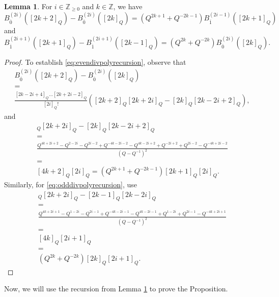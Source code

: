 \documentclass[10pt]{amsart}
\numberwithin{equation}{section}
\theoremstyle{definition}
\newtheorem{lemma}[theorem]{Lemma}
\begin{document}
\begin{lemma}\label{lem:divpowerpolyrecursion}
For $i\in \mathbb{Z}_{\ge 0}$ and $k\in \mathbb{Z}$, we have
    \begin{equation}\label{eq:evendivpolyrecursion}
    B_{\overline{0}}^{(2i)}([2k+2]_Q)-B_{\overline{0}}^{(2i)}([2k]_Q)=(Q^{2k+1}+Q^{-2k-1})B_{\overline{1}}^{(2i-1)}([2k+1]_Q)
\end{equation}
and
\begin{equation}\label{eq:odddivpolyrecursion}
    B_{\overline{1}}^{(2i+1)}([2k+1]_Q)-B_{\overline{1}}^{(2i+1)}([2k-1]_Q)=(Q^{2k}+Q^{-2k})B_{\overline{0}}^{(2i)}([2k]_Q).
\end{equation}
\end{lemma}
\begin{proof}
To establish \eqref{eq:evendivpolyrecursion}, observe that
\begin{gather*}
    B_{\overline{0}}^{(2i)}([2k+2]_Q)-B_{\overline{0}}^{(2i)}([2k]_Q)\\
    =\\
    \frac{[2k-2i+4]_Q\dots [2k+2i-2]_Q}{[2i]_Q!}([2k+2]_Q[2k+2i]_Q-[2k]_Q[2k-2i+2]_Q),
\end{gather*}
and 
\begin{gather*}
    [2k+2]_Q[2k+2i]_Q-[2k]_Q[2k-2i+2]_Q\\
    =
    \\
    \frac{Q^{4k+2i+2}-Q^{2-2i}-Q^{2i-2}+Q^{-4k-2i-2}-Q^{4k-2i+2}+Q^{-2i+2}+Q^{2i-2}-Q^{-4k+2i-2}}{(Q-Q^{-1})^2}\\
    =\\
    [4k+2]_Q[2i]_Q=(Q^{2k+1}+Q^{-2k-1})[2k+1]_Q[2i]_Q.
\end{gather*}
Similarly, for \eqref{eq:odddivpolyrecursion}, use
\begin{gather*}
    [2k+1]_Q[2k+2i]_Q-[2k-1]_Q[2k-2i]_Q\\
    =\\
    \frac{Q^{4k+2i+1}-Q^{1-2i}-Q^{2i-1}+Q^{-4k-2i-1}-Q^{4k-2i-1}+Q^{1-2i}+Q^{2i-1}-Q^{-4k+2i+1}}{(Q-Q^{-1})^2}\\
    =\\
    [4k]_Q[2i+1]_Q\\
    =\\
    (Q^{2k}+Q^{-2k})[2k]_Q[2i+1]_Q.
\end{gather*}
\end{proof}

Now, we will use the recursion from Lemma \ref{lem:divpowerpolyrecursion} to prove the Proposition.
\end{document}

